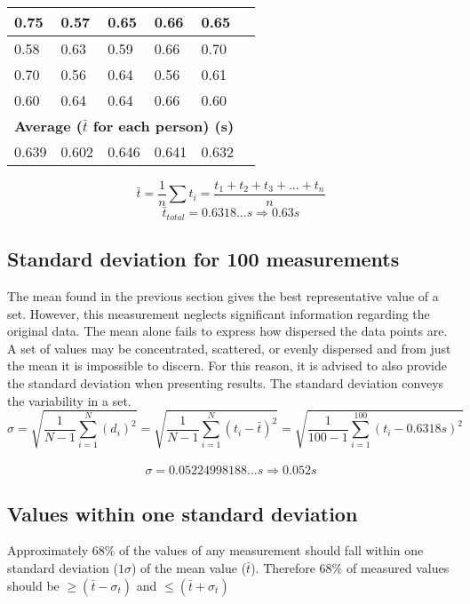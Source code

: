 \documentclass[11pt, letterpaper, includehead]{article}
\begin{document}
\begin{center}
\begin{tabular}{|   m{2cm}  |  m{2cm}  |  m{2cm}  |  m{2cm}  |  m{2cm}  |  m{2cm}  | }
    \hline
    0.75          & 0.57           & 0.65         & 0.66               & 0.65          \\
    \hline
    0.58          & 0.63           & 0.59         & 0.66               & 0.70          \\
    \hline
    0.70          & 0.56           & 0.64         & 0.56               & 0.61          \\
    \hline
    0.60          & 0.64           & 0.64         & 0.66               & 0.60          \\
    \hline
    \hline
    \multicolumn{5}{|c|}{\textbf{Average ($\bar{t}$ for each person) (s)}} \\
    \hline
    0.639         & 0.602          & 0.646        & 0.641              & 0.632         \\
    \hline
  \end{tabular}
\end{center}
$$\bar{t} = \frac{1}{n}\sum t_i = \frac{t_1 + t_2 + t_3 + ... + t_n}{n}$$
$$\bar{t}_{total} = 0.6318...s \Rightarrow \boxed{0.63s}$$

\subsection{Standard deviation for 100 measurements} %
The mean found in the previous section gives the best representative
value of a set. However, this measurement neglects significant
information regarding the original data. The mean alone fails to
express how dispersed the data points are. A set of values may be
concentrated, scattered, or evenly dispersed and from just the mean it is impossible to discern.
For this reason, it is advised to also provide the standard deviation
when presenting results. The standard deviation conveys the variability in a set.
$$\sigma = \sqrt{\frac{1}{N - 1}\sum_{i = 1}^{N} (d_i)^2} = \sqrt{\frac{1}{N - 1}\sum_{i = 1}^{N} (t_i - \bar{t})^2}= \sqrt{\frac{1}{100 - 1}\sum_{i = 1}^{100}(t_i - 0.6318s)^2}$$\\
$$\sigma = 0.05224998188...s \Rightarrow \boxed{0.052s}$$


\subsection{Values within one standard deviation} %
Approximately $68\%$ of the values of any measurement should fall within one
standard deviation ($1 \sigma$) of the mean value ($\bar{t}$). Therefore $68\%$ of measured
values should be $\geq (\bar{t} - \sigma_t)$ and $\leq (\bar{t} + \sigma_t)$\\
\end{document}
